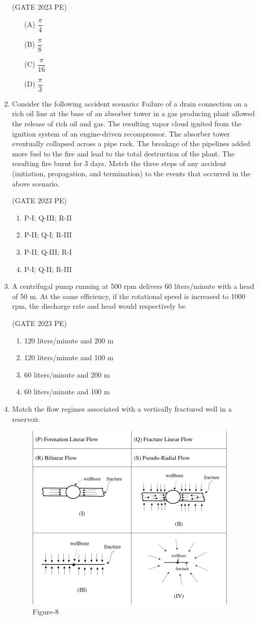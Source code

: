 \documentclass[journal,12pt,onecolumn]{exam}
\theoremstyle{remark}
\begin{document}
\begin{enumerate}
\hfill{(GATE 2023 PE)}\\
\begin{enumerate}
\item[(A)] $\dfrac{\pi}{4}$
\item[(B)] $\dfrac{\pi}{8}$
\item[(C)] $\dfrac{\pi}{16}$
\item[(D)] $\dfrac{\pi}{3}$
\end{enumerate}
\item Consider the following accident scenario:
Failure of a drain connection on a rich oil line at the base of an absorber tower in
a gas producing plant allowed the release of rich oil and gas. The resulting vapor
cloud ignited from the ignition system of an engine-driven recompressor. The
absorber tower eventually collapsed across a pipe rack. The breakage of the
pipelines added more fuel to the fire and lead to the total destruction of the plant.
The resulting fire burnt for 3 days.
Match the three steps of any accident (initiation, propagation, and termination) to
the events that occurred in the above scenario.


\hfill{(GATE 2023 PE)}\\
\begin{enumerate}
    \item P-I; Q-III; R-II
    \item P-II; Q-I; R-III
    \item P-II; Q-III; R-I
    \item P-I; Q-II; R-III
\end{enumerate}
\item A centrifugal pump running at 500 rpm delivers 60 liters/minute with a head of
50 m. At the same efficiency, if the rotational speed is increased to 1000 rpm, the
discharge rate and head would respectively be

\hfill{(GATE 2023 PE)}\\
\begin{enumerate}
    \item 120 liters/minute and 200 m
    \item 120 liters/minute and 100 m
    \item 60 liters/minute and 200 m
    \item60 liters/minute and 100 m
\end{enumerate}
\item Match the flow regimes associated with a vertically fractured well in a reservoir.
\begin{figure}[H]
    \centering
    \includegraphics[width=0.5\linewidth]{figs/fig8.png}
    \caption{Figure-8}
    \label{fig:figs/fig8.png}
\end{figure}


\end{enumerate}
\end{document}
